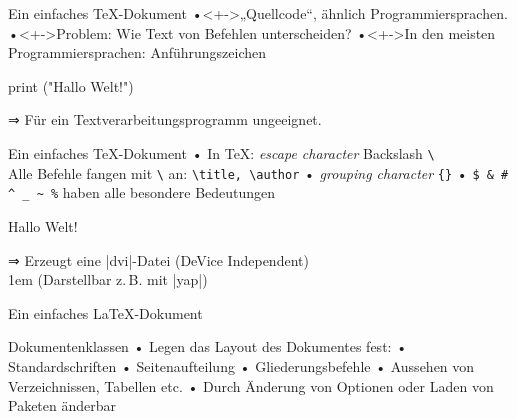 \begin{frame}[fragile]{Ein einfaches \TeX-Dokument}
•<+->„Quellcode“, ähnlich Programmiersprachen.
•<+->Problem: Wie Text von Befehlen unterscheiden?
•<+->In den meisten Programmiersprachen: Anführungszeichen
\•
\pause
\begin{lcode}
print ("Hallo Welt!")
\end{lcode}
⇒ Für ein Textverarbeitungsprogramm ungeeignet.
\end{frame}

\begin{frame}[fragile]{Ein einfaches \TeX-Dokument}
• In \TeX: \emph{escape character} Backslash \verb|\|\\
Alle Befehle fangen mit \verb|\| an: \verb|\title, \author|
• \emph{grouping character} \verb|{}|
• \verb|$ & # ^ _ ~ %| haben alle besondere Bedeutungen
\• 
\vspace{1cm}

\begin{lcode}
Hallo Welt! \bye
\end{lcode}

\pause\vspace{1cm}
⇒ Erzeugt eine |dvi|-Datei (DeVice Independent)\\
\kern1em (Darstellbar z.\,B. mit |yap|)
\end{frame}

\begin{frame}[fragile]{Ein einfaches \LaTeX-Dokument} 
\end{frame}

\begin{frame}{Dokumentenklassen}
• Legen das Layout des Dokumentes fest:
• Standardschriften
• Seitenaufteilung
• Gliederungsbefehle
• Aussehen von Verzeichnissen, Tabellen etc.
• Durch Änderung von Optionen oder Laden von Paketen änderbar
\•
\end{frame}

